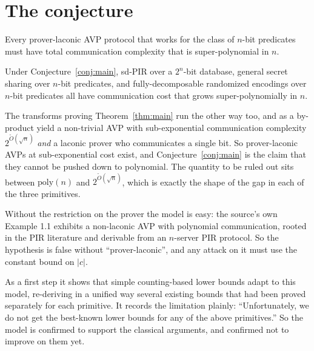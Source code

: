 \documentclass{aicr-conjecture}
\begin{document}
\section{The conjecture}\label{sec:conjectures}

\begin{conjecture}\label{conj:main}
Every prover-laconic AVP protocol that works for the class of $n$-bit
predicates must have total communication complexity that is
super-polynomial in $n$.
\end{conjecture}

\begin{theorem}\label{thm:main}
Under Conjecture~\ref{conj:main}, sd-PIR over a $2^{n}$-bit database,
general secret sharing over $n$-bit predicates, and fully-decomposable
randomized encodings over $n$-bit predicates all have communication cost
that grows super-polynomially in $n$.
\end{theorem}

\begin{remark}\label{rem:upper}
The transforms proving Theorem~\ref{thm:main} run the other way too, and
as a by-product yield a non-trivial AVP with sub-exponential
communication complexity $2^{\tilde{O}(\sqrt{n})}$ \emph{and} a laconic
prover who communicates a single bit. So prover-laconic AVPs at
sub-exponential cost exist, and Conjecture~\ref{conj:main} is the claim
that they cannot be pushed down to polynomial. The quantity to be ruled
out sits between $\mathrm{poly}(n)$ and $2^{\tilde{O}(\sqrt{n})}$, which
is exactly the shape of the gap in each of the three primitives.
\end{remark}

\begin{remark}\label{rem:laconic}
Without the restriction on the prover the model is easy: the source's own
Example 1.1 exhibits a non-laconic AVP with polynomial communication,
rooted in the PIR literature and derivable from an $n$-server PIR
protocol. So the hypothesis is false without ``prover-laconic'', and any
attack on it must use the constant bound on $|c|$.
\end{remark}

\begin{remark}\label{rem:progress}
As a first step it shows that simple counting-based lower bounds adapt to
this model, re-deriving in a unified way several existing bounds that had
been proved separately for each primitive. It records the limitation
plainly: ``Unfortunately, we do not get the best-known lower bounds for
any of the above primitives.'' So the model is confirmed to support the
classical arguments, and confirmed not to improve on them yet.
\end{remark}
\end{document}
